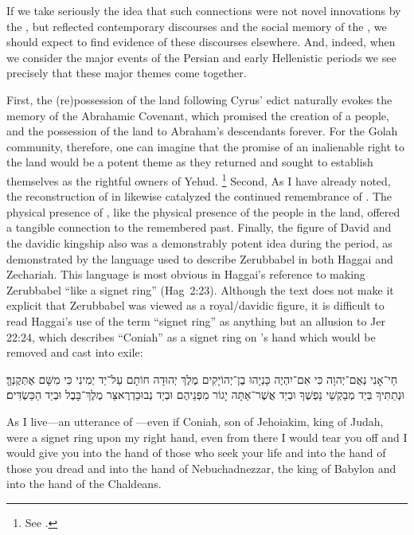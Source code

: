 If we take seriously the idea that such connections were not novel innovations by the \chronicler, but reflected contemporary discourses and the social memory of the \chronicler, we should expect to find evidence of these discourses elsewhere. And, indeed, when we consider the major events of the Persian and early Hellenistic periods we see precisely that these major themes come together.

First, the (re)possession of the land following Cyrus' edict naturally evokes the memory of the Abrahamic Covenant, which promised the creation of a people, and the possession of the land to Abraham's descendants forever. For the Golah community, therefore, one can imagine that the promise of an inalienable right to the land would be a potent theme as they returned and sought to establish themselves as the rightful owners of Yehud.%
    \footnote{See \cite{benzvi_bautch-knoppers2015}.}
Second, As I have already noted, the reconstruction of \thetemple in  likewise catalyzed the continued remembrance of \thetemple. The physical presence of \thetemple, like the physical presence of the people in the land, offered a tangible connection to the remembered past. Finally, the figure of David and the davidic kingship also was a demonstrably potent idea during the \secondtemple period, as demonstrated by the language used to describe Zerubbabel in both Haggai and Zechariah. This language is most obvious in Haggai's reference to \yahweh making Zerubbabel ``like a signet ring'' (Hag~2:23). Although the text does not make it explicit that Zerubbabel was viewed as a royal/davidic figure, it is difficult to read Haggai's use of the term ``signet ring'' as anything but an allusion to Jer 22:24, which describes ``Coniah'' as a signet ring on \yahweh's hand which would be removed and cast into exile:
\begin{hebrewtext}
    חַי־אָנִי נְאֻם־יְהוָה כִּי אִם־יִהְיֶה כָּנְיָהוּ בֶן־יְהוֹיָקִים מֶלֶךְ יְהוּדָה חוֹתָם עַל־יַד יְמִינִי כִּי מִשָּׁם אֶתְּקֶנְךָּ׃ 
    וּנְתַתִּיךָ בְּיַד מְבַקְשֵׁי נַפְשֶׁךָ וּבְיַד אֲשֶׁר־אַתָּה יָגוֹר מִפְּנֵיהֶם וּבְיַד נְבוּכַדְרֶאצַּר מֶלֶךְ־בָּבֶל וּבְיַד הַכַּשְׂדִּים׃
\end{hebrewtext}
\begin{translation}
    As I live---an utterance of \yahweh---even if Coniah, son of Jehoiakim, king of Judah, were a signet ring upon my right hand, even from there I would tear you off
    and I would give you into the hand of those who seek your life and into the hand of those you dread and into the hand of Nebuchadnezzar, the king of Babylon and into the hand of the Chaldeans.
\end{translation}
